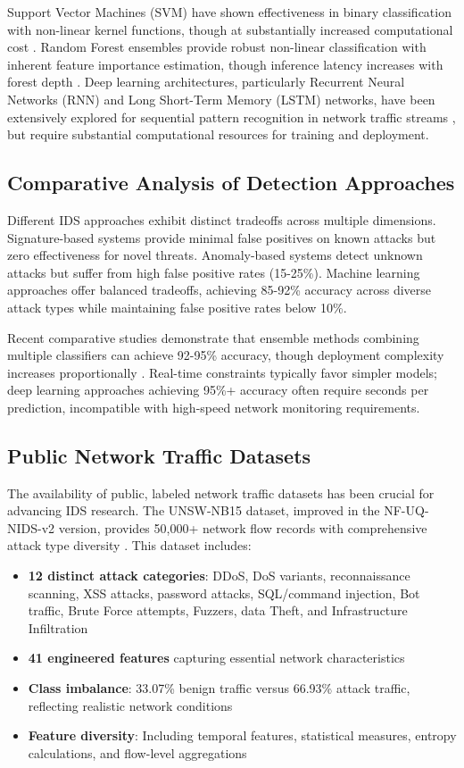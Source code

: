 \documentclass[conference]{IEEEtran}
\begin{document}
Support Vector Machines (SVM) have shown effectiveness in binary classification with non-linear kernel functions, though at substantially increased computational cost \cite{ref8}. Random Forest ensembles provide robust non-linear classification with inherent feature importance estimation, though inference latency increases with forest depth \cite{ref9}. Deep learning architectures, particularly Recurrent Neural Networks (RNN) and Long Short-Term Memory (LSTM) networks, have been extensively explored for sequential pattern recognition in network traffic streams \cite{ref10}, but require substantial computational resources for training and deployment.

\subsection{Comparative Analysis of Detection Approaches}

Different IDS approaches exhibit distinct tradeoffs across multiple dimensions. Signature-based systems provide minimal false positives on known attacks but zero effectiveness for novel threats. Anomaly-based systems detect unknown attacks but suffer from high false positive rates (15-25\%). Machine learning approaches offer balanced tradeoffs, achieving 85-92\% accuracy across diverse attack types while maintaining false positive rates below 10\%.

Recent comparative studies demonstrate that ensemble methods combining multiple classifiers can achieve 92-95\% accuracy, though deployment complexity increases proportionally \cite{ref19}. Real-time constraints typically favor simpler models; deep learning approaches achieving 95\%+ accuracy often require seconds per prediction, incompatible with high-speed network monitoring requirements.

\subsection{Public Network Traffic Datasets}

The availability of public, labeled network traffic datasets has been crucial for advancing IDS research. The UNSW-NB15 dataset, improved in the NF-UQ-NIDS-v2 version, provides 50,000+ network flow records with comprehensive attack type diversity \cite{ref15}. This dataset includes:

\begin{itemize}
    \item \textbf{12 distinct attack categories}: DDoS, DoS variants, reconnaissance scanning, XSS attacks, password attacks, SQL/command injection, Bot traffic, Brute Force attempts, Fuzzers, data Theft, and Infrastructure Infiltration
    \item \textbf{41 engineered features} capturing essential network characteristics
    \item \textbf{Class imbalance}: 33.07\% benign traffic versus 66.93\% attack traffic, reflecting realistic network conditions
    \item \textbf{Feature diversity}: Including temporal features, statistical measures, entropy calculations, and flow-level aggregations
\end{itemize}
\end{document}
